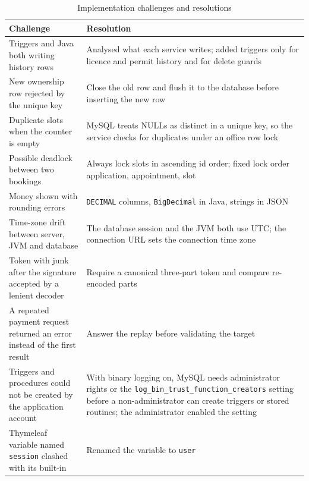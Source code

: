 \begin{table}[H]
\centering\small
\caption{Implementation challenges and resolutions}\label{tab:challenges}
\begin{tabularx}{\linewidth}{@{}p{4.3cm}X@{}}
\toprule \textbf{Challenge} & \textbf{Resolution}\\ \midrule
Triggers and Java both writing history rows & Analysed what each service writes; added triggers only for licence and permit history and for delete guards\\
New ownership row rejected by the unique key & Close the old row and flush it to the database before inserting the new row\\
Duplicate slots when the counter is empty & MySQL treats NULLs as distinct in a unique key, so the service checks for duplicates under an office row lock\\
Possible deadlock between two bookings & Always lock slots in ascending id order; fixed lock order application, appointment, slot\\
Money shown with rounding errors & \texttt{DECIMAL} columns, \texttt{BigDecimal} in Java, strings in JSON\\
Time-zone drift between server, JVM and database & The database session and the JVM both use UTC; the connection URL sets the connection time zone\\
Token with junk after the signature accepted by a lenient decoder & Require a canonical three-part token and compare re-encoded parts\\
A repeated payment request returned an error instead of the first result & Answer the replay before validating the target\\
Triggers and procedures could not be created by the application account & With binary logging on, MySQL needs administrator rights or the \texttt{log\_bin\_trust\_function\_creators} setting before a non-administrator can create triggers or stored routines; the administrator enabled the setting\\
Thymeleaf variable named \texttt{session} clashed with its built-in & Renamed the variable to \texttt{user}\\
\bottomrule
\end{tabularx}
\end{table}
